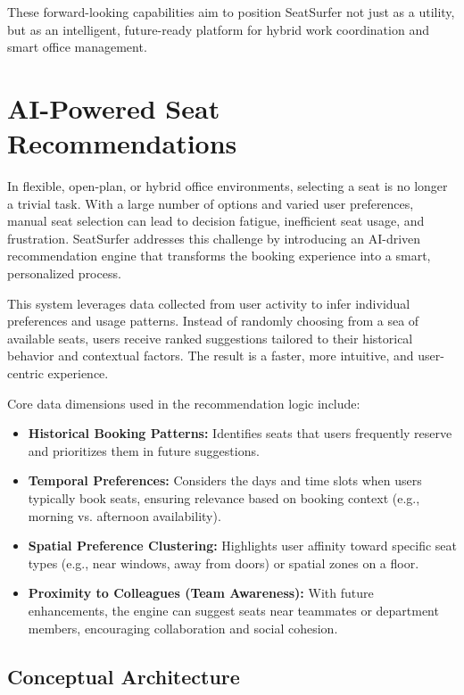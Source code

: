 \documentclass[12pt,a4paper]{report}
\begin{document}
These forward-looking capabilities aim to position SeatSurfer not just as a utility, but as an intelligent, future-ready platform for hybrid work coordination and smart office management.

\section{AI-Powered Seat Recommendations}

In flexible, open-plan, or hybrid office environments, selecting a seat is no longer a trivial task. With a large number of options and varied user preferences, manual seat selection can lead to decision fatigue, inefficient seat usage, and frustration. SeatSurfer addresses this challenge by introducing an AI-driven recommendation engine that transforms the booking experience into a smart, personalized process.

This system leverages data collected from user activity to infer individual preferences and usage patterns. Instead of randomly choosing from a sea of available seats, users receive ranked suggestions tailored to their historical behavior and contextual factors. The result is a faster, more intuitive, and user-centric experience.

Core data dimensions used in the recommendation logic include:

\begin{itemize}
\item \textbf{Historical Booking Patterns:}
Identifies seats that users frequently reserve and prioritizes them in future suggestions.
\item \textbf{Temporal Preferences:}  
Considers the days and time slots when users typically book seats, ensuring relevance based on booking context (e.g., morning vs. afternoon availability).
\item \textbf{Spatial Preference Clustering:}  
Highlights user affinity toward specific seat types (e.g., near windows, away from doors) or spatial zones on a floor.
\item \textbf{Proximity to Colleagues (Team Awareness):}  
With future enhancements, the engine can suggest seats near teammates or department members, encouraging collaboration and social cohesion.
\end{itemize}

\subsection*{Conceptual Architecture}
\end{document}
